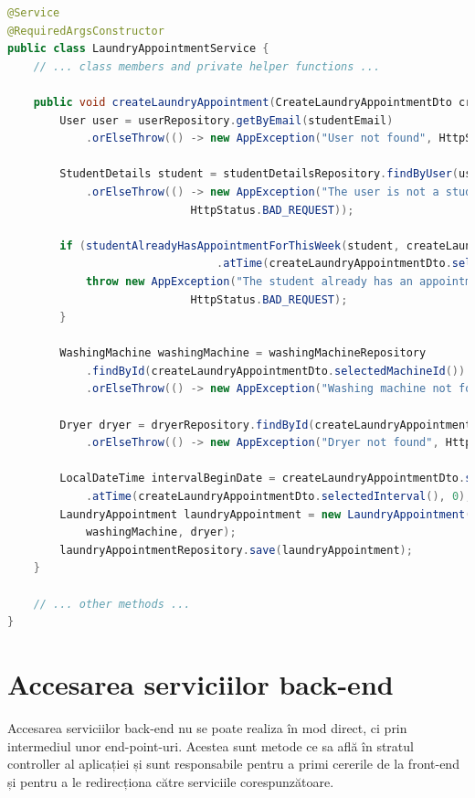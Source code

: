 \documentclass[12pt,a4paper]{report}
\theoremstyle{definition}
\theoremstyle{remark}
\begin{document}
\begin{lstlisting}[language=Java, caption={Clasa LaundryAppointmentService}]
@Service
@RequiredArgsConstructor
public class LaundryAppointmentService {
    // ... class members and private helper functions ...

    public void createLaundryAppointment(CreateLaundryAppointmentDto createLaundryAppointmentDto, String studentEmail) throws AppException {
        User user = userRepository.getByEmail(studentEmail)
            .orElseThrow(() -> new AppException("User not found", HttpStatus.NOT_FOUND));

        StudentDetails student = studentDetailsRepository.findByUser(user)
            .orElseThrow(() -> new AppException("The user is not a student",
                            HttpStatus.BAD_REQUEST));

        if (studentAlreadyHasAppointmentForThisWeek(student, createLaundryAppointmentDto.selectedDate()
                                .atTime(createLaundryAppointmentDto.selectedInterval(), 0))) {
            throw new AppException("The student already has an appointment for this week",
                            HttpStatus.BAD_REQUEST);
        }

        WashingMachine washingMachine = washingMachineRepository
            .findById(createLaundryAppointmentDto.selectedMachineId())
            .orElseThrow(() -> new AppException("Washing machine not found", HttpStatus.NOT_FOUND));

        Dryer dryer = dryerRepository.findById(createLaundryAppointmentDto.selectedDryerId())
            .orElseThrow(() -> new AppException("Dryer not found", HttpStatus.NOT_FOUND));

        LocalDateTime intervalBeginDate = createLaundryAppointmentDto.selectedDate()
            .atTime(createLaundryAppointmentDto.selectedInterval(), 0);
        LaundryAppointment laundryAppointment = new LaundryAppointment(intervalBeginDate, student,
            washingMachine, dryer);
        laundryAppointmentRepository.save(laundryAppointment);
    }

    // ... other methods ...
}
\end{lstlisting}

\section{Accesarea serviciilor back-end}

\par Accesarea serviciilor back-end nu se poate realiza în mod direct, ci prin intermediul unor end-point-uri. Acestea sunt metode ce sa află în stratul controller al aplicației și sunt responsabile pentru a primi cererile de la front-end și pentru a le redirecționa către serviciile corespunzătoare.
\end{document}
